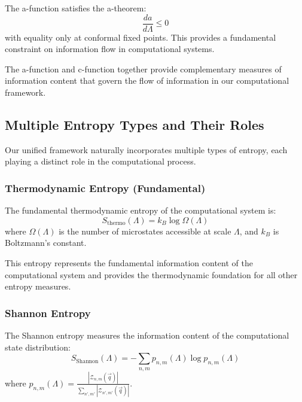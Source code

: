 \begin{theorem}
\label{thm:a-function-monotonicity}
The a-function satisfies the a-theorem:
\[
\frac{da}{d\Lambda} \leq 0
\]
with equality only at conformal fixed points. This provides a fundamental constraint on information flow in computational systems.
\end{theorem}

The a-function and c-function together provide complementary measures of information content that govern the flow of information in our computational framework.

\subsection{Multiple Entropy Types and Their Roles}

Our unified framework naturally incorporates multiple types of entropy, each playing a distinct role in the computational process.

\subsubsection{Thermodynamic Entropy (Fundamental)}

\begin{definition}
\label{def:thermodynamic-entropy}
The fundamental thermodynamic entropy of the computational system is:
\[
S_{\text{thermo}}(\Lambda) = k_B \log \Omega(\Lambda)
\]
where $\Omega(\Lambda)$ is the number of microstates accessible at scale $\Lambda$, and $k_B$ is Boltzmann's constant.
\end{definition}

This entropy represents the fundamental information content of the computational system and provides the thermodynamic foundation for all other entropy measures.

\subsubsection{Shannon Entropy}

\begin{definition}
\label{def:shannon-entropy}
The Shannon entropy measures the information content of the computational state distribution:
\[
S_{\text{Shannon}}(\Lambda) = -\sum_{n,m} p_{n,m}(\Lambda) \log p_{n,m}(\Lambda)
\]
where $p_{n,m}(\Lambda) = \frac{|\mathcal{Z}_{n,m}(\vec{q})|}{\sum_{n',m'} |\mathcal{Z}_{n',m'}(\vec{q})|}$.
\end{definition}

